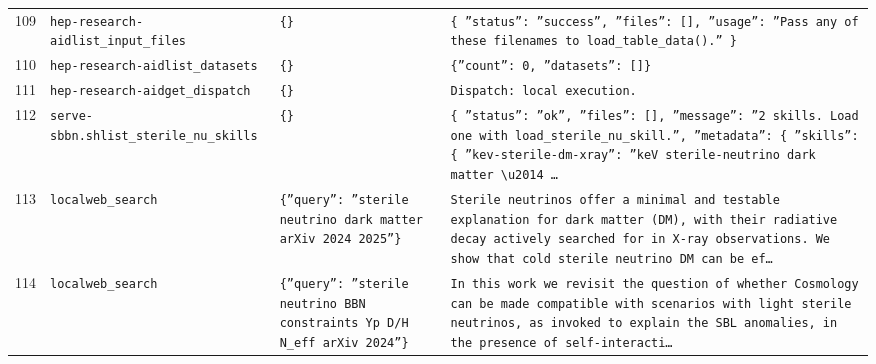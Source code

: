 \documentclass[11pt,a4paper]{article}
\begin{document}
\begin{longtable}{@{}p{}p{}p{}p{}@{}}
109 & \texttt{hep-research-aid}\newline\texttt{list\_\allowbreak{}input\_\allowbreak{}files} & \texttt{\{\}\allowbreak{}} & \texttt{\{   ''status'':\allowbreak{} ''success'',\allowbreak{}   ''files'':\allowbreak{} []\allowbreak{},\allowbreak{}   ''usage'':\allowbreak{} ''Pass any of these filenames to load\_\allowbreak{}table\_\allowbreak{}data()\allowbreak{}.'' \}\allowbreak{}} \\
110 & \texttt{hep-research-aid}\newline\texttt{list\_\allowbreak{}datasets} & \texttt{\{\}\allowbreak{}} & \texttt{\{''count'':\allowbreak{} 0,\allowbreak{} ''datasets'':\allowbreak{} []\allowbreak{}\}\allowbreak{}} \\
111 & \texttt{hep-research-aid}\newline\texttt{get\_\allowbreak{}dispatch} & \texttt{\{\}\allowbreak{}} & \texttt{Dispatch:\allowbreak{} local execution.} \\
112 & \texttt{serve-sbbn.sh}\newline\texttt{list\_\allowbreak{}sterile\_\allowbreak{}nu\_\allowbreak{}skills} & \texttt{\{\}\allowbreak{}} & \texttt{\{   ''status'':\allowbreak{} ''ok'',\allowbreak{}   ''files'':\allowbreak{} []\allowbreak{},\allowbreak{}   ''message'':\allowbreak{} ''2 skills. Load one with load\_\allowbreak{}sterile\_\allowbreak{}nu\_\allowbreak{}skill.'',\allowbreak{}   ''metadata'':\allowbreak{} \{     ''skills'':\allowbreak{} \{       ''kev-sterile-dm-xray'':\allowbreak{} ''keV sterile-neutrino dark matter \textbackslash{}\allowbreak{}u2014 \ldots{}\allowbreak{}} \\
113 & \texttt{local}\newline\texttt{web\_\allowbreak{}search} & \texttt{\{''query'':\allowbreak{} ''sterile neutrino dark matter arXiv 2024 2025''\}\allowbreak{}} & \texttt{Sterile neutrinos offer a minimal and testable explanation for dark matter (DM)\allowbreak{},\allowbreak{} with their radiative decay actively searched for in X-ray observations. We show that cold sterile neutrino DM can be ef\ldots{}\allowbreak{}} \\
114 & \texttt{local}\newline\texttt{web\_\allowbreak{}search} & \texttt{\{''query'':\allowbreak{} ''sterile neutrino BBN constraints Yp D/\allowbreak{}H N\_\allowbreak{}eff arXiv 2024''\}\allowbreak{}} & \texttt{In this work we revisit the question of whether Cosmology can be made compatible with scenarios with light sterile neutrinos,\allowbreak{} as invoked to explain the SBL anomalies,\allowbreak{} in the presence of self-interacti\ldots{}\allowbreak{}} \\

\end{longtable}
\end{document}
